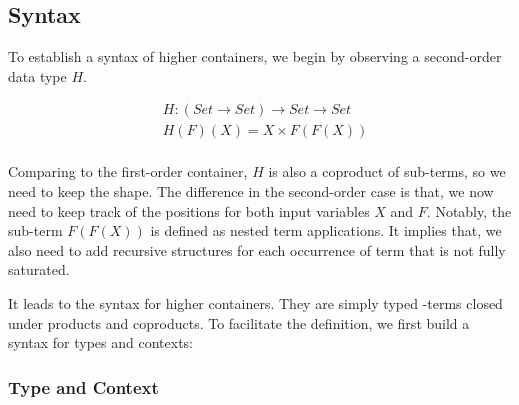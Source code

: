 \subsection{Syntax}

To establish a syntax of higher containers, we begin by observing a second-order data type $H$.

\begin{align*}
& H : (Set \to Set) \to Set \to Set \\
& H (F) (X) = X \times F (F (X)) \\
\end{align*}

Comparing to the first-order container, $H$ is also a coproduct of sub-terms, so we need to keep the shape. The difference in the second-order case is that, we now need to keep track of the positions for both input variables $X$ and $F$. Notably, the sub-term $F(F(X))$ is defined as nested term applications. It implies that, we also need to add recursive structures for each occurrence of term that is not fully saturated.

It leads to the syntax for higher containers. They are simply typed \lambda-terms closed under products and coproducts. To facilitate the definition, we first build a syntax for types and contexts:

\subsubsection*{Type and Context}

\begin{code}%
\>[0]\AgdaSpace{}%
\AgdaSpace{}%
\AgdaSymbol{:}\AgdaSpace{}%
\AgdaSpace{}%
\<%
\\
\>[0][@{}l@{\AgdaIndent{0}}]%
\>[2]\AgdaInductiveConstructor{*}\AgdaSpace{}%
\AgdaSymbol{:}\AgdaSpace{}%
\<%
\\
%
\>[2]\AgdaSpace{}%
\AgdaSymbol{:}\AgdaSpace{}%
\AgdaSpace{}%
\AgdaSpace{}%
\AgdaSpace{}%
\AgdaSpace{}%
\<%
\\
%
\\[\AgdaEmptyExtraSkip]%
\>[0]\AgdaSpace{}%
\AgdaSpace{}%
\AgdaSymbol{:}\AgdaSpace{}%
\AgdaSpace{}%
\<%
\\
\>[0][@{}l@{\AgdaIndent{0}}]%
\>[2]%
\>[6]\AgdaSymbol{:}\AgdaSpace{}%
\<%
\\
%
\>[2]\AgdaSpace{}%
\AgdaSymbol{:}\AgdaSpace{}%
\AgdaSpace{}%
\AgdaSpace{}%
\AgdaSpace{}%
\AgdaSpace{}%
\<%
\end{code}

